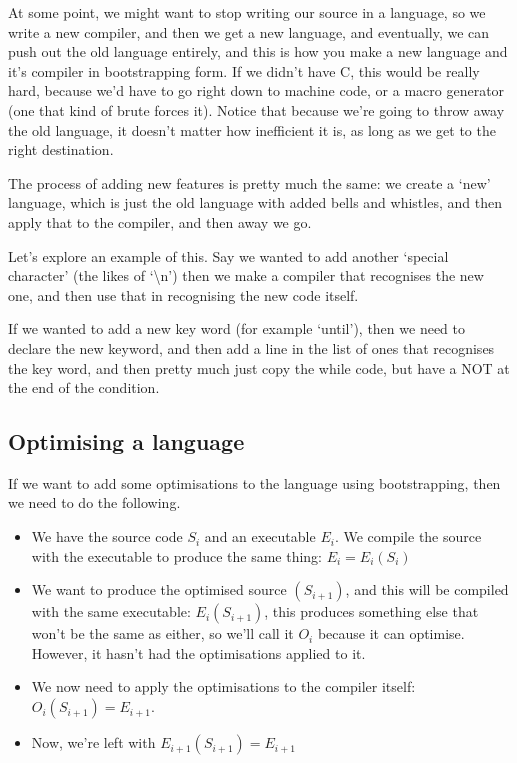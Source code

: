 \documentclass[11pt,a4paper,titlepage,dvipsnames,cmyk]{scrartcl}
\begin{document}
At some point, we might want to stop writing our source in a language, so
we write a new compiler, and then we get a new language, and eventually,
we can push out the old language entirely, and this is how you make a new
language and it's compiler in bootstrapping form. If we didn't have C,
this would be really hard, because we'd have to go right down to machine
code, or a macro generator (one that kind of brute forces it). Notice that
because we're going to throw away the old language, it doesn't matter how
inefficient it is, as long as we get to the right destination.

The process of adding new features is pretty much the same: we create a
`new' language, which is just the old language with added bells and
whistles, and then apply that to the compiler, and then away we go.

Let's explore an example of this. Say we wanted to add another `special
character' (the likes of `\textbackslash n') then we make a compiler that
recognises the new one, and then use that in recognising the new code
itself.

If we wanted to add a new key word (for example `until'), then we need to
declare the new keyword, and then add a line in the list of ones that
recognises the key word, and then pretty much just copy the while code,
but have a NOT at the end of the condition.

\subsection{Optimising a language}%
\label{sub:optimising-bootstrapping}
If we want to add some optimisations to the language using bootstrapping,
then we need to do the following.

\begin{itemize}
    \item We have the source code $S_i$ and an executable $E_i$. We
        compile the source with the executable to produce the same thing:
        $E_i = E_i(S_i)$
    \item We want to produce the optimised source $(S_{i+1})$, and this
        will be compiled with the same executable: $E_i(S_{i+1})$, this
        produces something else that won't be the same as either, so we'll
        call it $O_i$ because it can optimise. However, it hasn't had the
        optimisations applied to it.
    \item We now need to apply the optimisations to the compiler itself:
        $O_i(S_{i+1}) = E_{i+1}$.
    \item Now, we're left with $E_{i+1}(S_{i+1}) = E_{i+1}$
\end{itemize}
\end{document}

